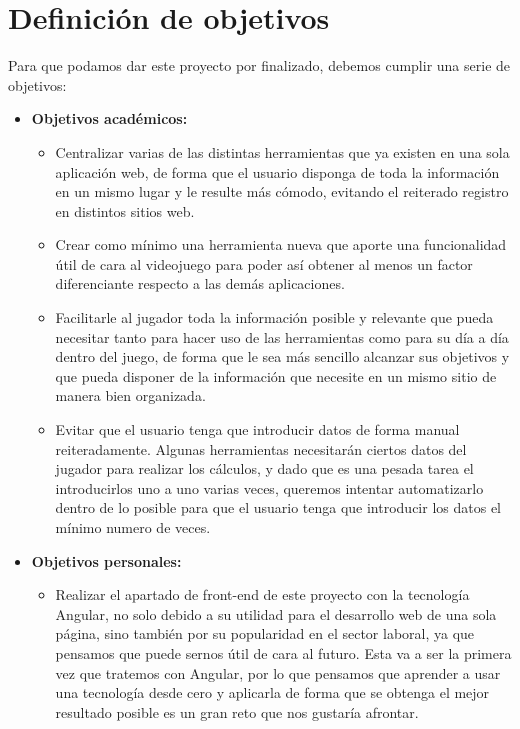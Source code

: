 \chapter{Definici\'on de objetivos}\label{defobjetivos}

Para que podamos dar este proyecto por finalizado, debemos cumplir una serie de objetivos:

\begin{itemize}
	\item \textbf{Objetivos académicos:}
	\begin{itemize}
		\item Centralizar varias de las distintas herramientas que ya existen en una sola aplicación web, de forma que el usuario disponga de toda la información en un mismo lugar y le resulte más cómodo, evitando el reiterado registro en distintos sitios web.
		
		\item Crear como mínimo una herramienta nueva que aporte una funcionalidad útil de cara al videojuego para poder así obtener al menos un factor diferenciante respecto a las demás aplicaciones.
		
		\item Facilitarle al jugador toda la información posible y relevante que pueda necesitar tanto para hacer uso de las herramientas como para su día a día dentro del juego, de forma que le sea más sencillo alcanzar sus objetivos y que pueda disponer de la información que necesite en un mismo sitio de manera bien organizada.
		
		\item Evitar que el usuario tenga que introducir datos de forma manual reiteradamente. Algunas herramientas necesitarán ciertos datos del jugador para realizar los cálculos, y dado que es una pesada tarea el introducirlos uno a uno varias veces, queremos intentar automatizarlo dentro de lo posible para que el usuario tenga que introducir los datos el mínimo numero de veces.
	\end{itemize}
	\item \textbf{Objetivos personales:}
	\begin{itemize}
		\item Realizar el apartado de front-end de este proyecto con la tecnología Angular, no solo debido a su utilidad para el desarrollo web de una sola página, sino también por su popularidad en el sector laboral, ya que pensamos que puede sernos útil de cara al futuro. Esta va a ser la primera vez que tratemos con Angular, por lo que pensamos que aprender a usar una tecnología desde cero y aplicarla de forma que se obtenga el mejor resultado posible es un gran reto que nos gustaría afrontar.
		

\end{itemize}
\end{itemize}
